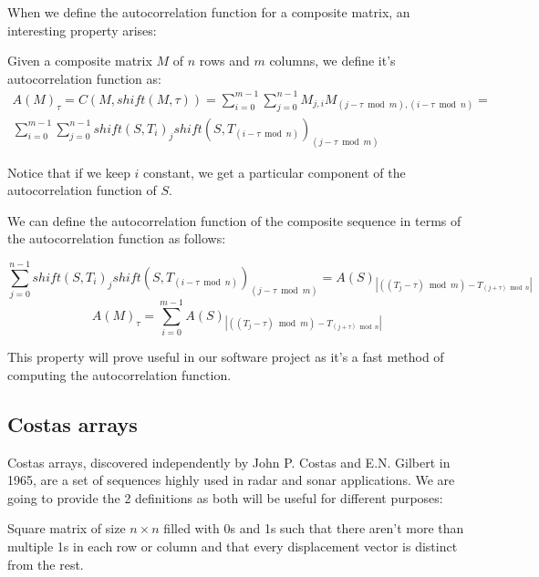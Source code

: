 When we define the autocorrelation function for a composite matrix, an
interesting property arises:

\begin{definition}
  Given a composite matrix $M$ of $n$ rows and $m$ columns, we define it's
  autocorrelation function as:
  \begin{equation}
    \begin{split}
      A(M)_{\tau} = C(M, shift(M, \tau)) = \sum_{i=0}^{m-1}\sum_{j=0}^{n-1}M_{j, i}M_{(j-\tau \bmod m),(i - \tau \bmod n)} = \\
      \sum_{i=0}^{m-1}\sum_{j=0}^{n-1}shift(S, T_{i})_{j}shift(S, T_{(i - \tau \bmod n)})_{(j-\tau \bmod m)}
    \end{split}
  \end{equation}
\end{definition}

Notice that if we keep $i$ constant, we get a particular component of the
autocorrelation function of $S$.

\begin{property} We can define the autocorrelation function of the composite
sequence in terms of the autocorrelation function as follows:

\begin{equation}
  \sum_{j=0}^{n-1}shift(S, T_{i})_{j}shift(S, T_{(i - \tau \bmod n)})_{(j-\tau \bmod m)} = A(S)_{|((T_{j} - \tau) \bmod m) - T_{(j + \tau) \bmod n}|}
\end{equation}
\begin{equation}
  A(M)_{\tau} = \sum_{i=0}^{m-1} A(S)_{|((T_{j} - \tau) \bmod m) - T_{(j + \tau) \bmod n}|}
\end{equation}

\end{property}

This property will prove useful in our software project as it's a fast method
of computing the autocorrelation function.

\subsection{Costas arrays}

Costas arrays, discovered independently by John P. Costas\cite{costas_costas}
and E.N. Gilbert \cite{gilbert_costas} in 1965, are a set of sequences highly
used in radar and sonar applications. We are going to provide the 2 definitions
as both will be useful for different purposes:

\begin{definition}
  Square matrix of size $n×n$ filled with 0s and 1s such that there
  aren't more than multiple 1s in each row or column and that every
  displacement vector is distinct from the rest.
\end{definition}

